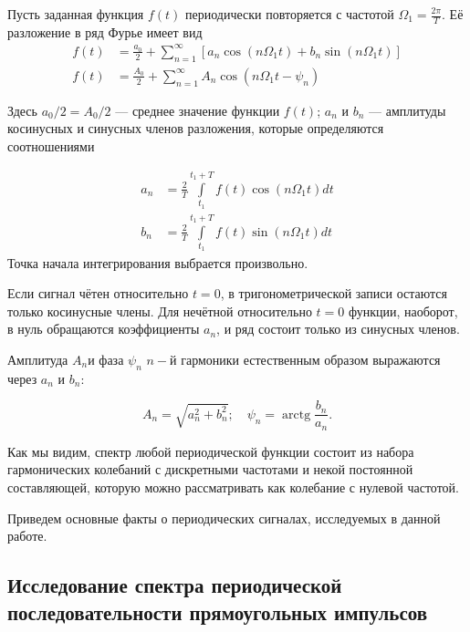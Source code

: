 Пусть заданная функция $f(t)$
периодически повторяется с частотой
$\Omega_{1} = \frac{2\pi}{T}$. Её
разложение в ряд Фурье имеет вид
\begin{equation}
\begin{aligned} 
f(t) &= \frac{a_{0}}{2}+\sum_{n=1}^{\infty}\left[ a_{n} \cos \left(n\Omega_{1} t\right) + b_{n} \sin \left(n \Omega_{1} t\right)\right] \\ f(t) &= \frac{A_{0}}{2}+\sum_{n=1}^{\infty} A_{n} \cos \left(n \Omega_{1} t-\psi_{n}\right)
\end{aligned}
\end{equation}

Здесь $a_{0}/2 =A_{0}/2$ — среднее значение функции $ f(t) $; $ a_{n} $ и $ b_{n} $ — амплитуды косинусных и синусных членов разложения, которые определяются соотношениями 

\begin{equation}
\begin{aligned} a_{n} &=\frac{2}{T}
\int\limits_{t_{1}}^{t_{1}+T} f(t) \cos \left(n
\Omega_{1} t\right) d t \\ b_{n}
&=\frac{2}{T} \int\limits_{t_{1}}^{t_{1}+T}
f(t) \sin \left(n \Omega_{1} t\right) d
t \end{aligned}
\end{equation}
Точка начала интегрирования выбрается произвольно.

Если сигнал чётен относительно $  t = 0 $, в тригонометрической записи остаются только косинусные члены. Для нечётной относительно $ t = 0  $ функции, наоборот, в нуль обращаются коэффициенты $ a_{n} $, и ряд состоит только из синусных членов.

Амплитуда $ A_{n} $и фаза $\psi_{n}$ $n-$й гармоники естественным образом выражаются через $a_{n}$ и $b_{n}$:

\begin{equation}
A_{n}=\sqrt{a_{n}^{2}+b_{n}^{2}} ; \quad \psi_{n}=\operatorname{arctg} \frac{b_{n}}{a_{n}}.
\end{equation}

Как мы видим, спектр любой периодической функции состоит из набора гармонических колебаний с дискретными частотами и некой постоянной составляющей, которую можно рассматривать как колебание с нулевой частотой.

Приведем основные факты о периодических сигналах, исследуемых в данной работе.


\subsection*{Исследование спектра периодической последовательности прямоугольных импульсов}

